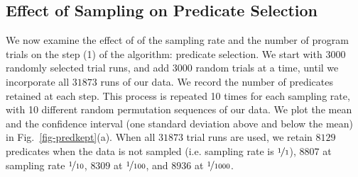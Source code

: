 \subsection{Effect of Sampling on Predicate Selection}

We now examine the effect of of the sampling rate and the number of
program trials on the step (1) of the algorithm: predicate selection.
We start with $3000$ randomly
selected trial runs, and add $3000$ random trials at a time, until we
incorporate all $31873$ runs of our data.  We record the number of
predicates retained at each step.  This process is repeated 10 times
for each sampling rate, with 10 different random permutation sequences
of our data. We plot the mean and the confidence interval (one
standard deviation above and below the mean) in
Fig.~\ref{fig-predkept}(a).  When all $31873$ trial
runs are used, we retain $8129$ predicates when the data is not
sampled (i.e. sampling rate is $\nicefrac{1}{1}$), $8807$ at sampling
rate $\nicefrac{1}{10}$, $8309$ at $\nicefrac{1}{100}$, and $8936$ at
$\nicefrac{1}{1000}$.

